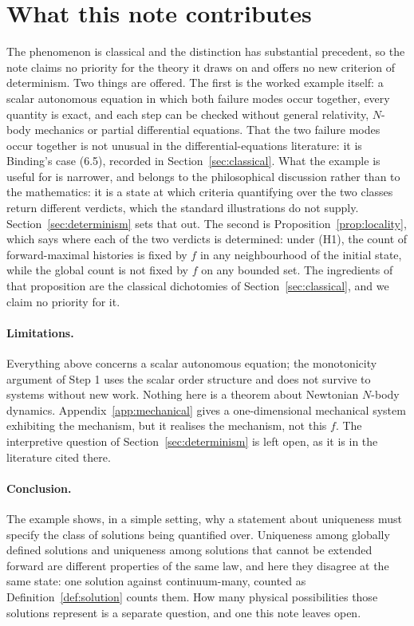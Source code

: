 \documentclass[12pt]{article}
\theoremstyle{plain}
\theoremstyle{definition}
\theoremstyle{remark}
\begin{document}
\section{What this note contributes}\label{sec:contribution}

The phenomenon is classical and the distinction has substantial precedent, so
the note claims no priority for the theory it draws on and offers no new
criterion of determinism. Two things are offered. The first is the
worked example itself: a scalar autonomous equation in which both failure modes
occur together, every quantity is exact, and each step can be checked without
general relativity, $N$-body mechanics or partial differential equations. That
the two failure modes occur together is not unusual in the differential-equations
literature: it is Binding's case (6.5), recorded in
Section~\ref{sec:classical}. What the example is useful for is narrower, and
belongs to the philosophical discussion rather than to the mathematics: it is a
state at which criteria quantifying over the two classes return different
verdicts, which the standard illustrations do not supply.
Section~\ref{sec:determinism} sets that out. The second is Proposition~\ref{prop:locality}, which says where
each of the two verdicts is determined: under (H1), the count of forward-maximal
histories is fixed by $f$ in any neighbourhood of the initial state, while the global count
is not fixed by $f$ on any bounded set. The ingredients of that proposition are
the classical dichotomies of Section~\ref{sec:classical}, and we claim no
priority for it.

\paragraph{Limitations.} Everything above concerns a scalar autonomous equation;
the monotonicity argument of Step 1 uses the scalar order structure and does not
survive to systems without new work. Nothing here is a theorem about Newtonian
$N$-body dynamics. Appendix~\ref{app:mechanical} gives a one-dimensional
mechanical system exhibiting the mechanism, but it realises the mechanism, not
this $f$. The interpretive question of Section~\ref{sec:determinism} is left
open, as it is in the literature cited there.

\paragraph{Conclusion.} The example shows, in a simple setting, why a statement
about uniqueness must specify the class of solutions being quantified over.
Uniqueness among globally defined solutions and uniqueness among solutions that
cannot be extended forward are different properties of the same law, and here
they disagree at the same state: one solution against continuum-many, counted as
Definition~\ref{def:solution} counts them. How many physical possibilities those
solutions represent is a separate question, and one this note leaves open.
\end{document}
